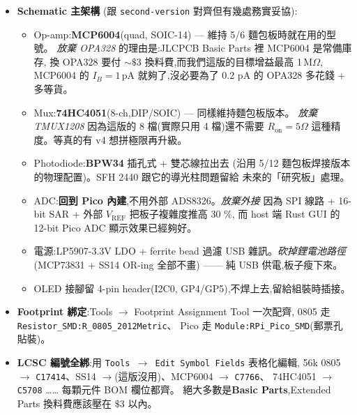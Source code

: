 \begin{itemize}[leftmargin=2em,itemsep=0pt]
  \item \textbf{Schematic 主架構} (跟 \texttt{second-version} 對齊但有幾處務實妥協):
        \begin{itemize}[leftmargin=2em,itemsep=0pt]
          \item Op-amp:\textbf{MCP6004}(quad, SOIC-14) — 維持 5/6 麵包板時就在用的型號。
                \emph{放棄 OPA328} 的理由是:JLCPCB Basic Parts 裡 MCP6004 是常備庫存,
                換 OPA328 要付 \(\sim \$3\) 換料費,而我們這版的目標增益最高 1\,M\(\Omega\),
                MCP6004 的 \(I_B = 1\,\mathrm{pA}\) 就夠了,沒必要為了 0.2 pA 的 OPA328
                多花錢 + 多等貨。
          \item Mux:\textbf{74HC4051}(8-ch,DIP/SOIC) — 同樣維持麵包板版本。
                \emph{放棄 TMUX1208} 因為這版的 8 檔(實際只用 4 檔)還不需要 \(R_\text{on} = 5\Omega\)
                這種精度。等真的有 v4 想拼極限再升級。
          \item Photodiode:\textbf{BPW34} 插孔式 + 雙芯線拉出去
                (沿用 5/12 麵包板焊接版本的物理配置)。SFH 2440 跟它的導光柱問題留給
                未來的「研究板」處理。
          \item ADC:\textbf{回到 Pico 內建},不用外部 ADS8326。\emph{放棄外接}
                因為 SPI 線路 + 16-bit SAR + 外部 \(V_\text{REF}\) 把板子複雜度推高 30 \%,
                而 host 端 Rust GUI 的 12-bit Pico ADC 顯示效果已經夠好。
          \item 電源:LP5907-3.3V LDO + ferrite bead 過濾 USB 雜訊。\emph{砍掉鋰電池路徑}
                (MCP73831 + SS14 OR-ing 全部不畫) —— 純 USB 供電,板子瘦下來。
          \item OLED 接腳留 4-pin header(I2C0, GP4/GP5),不焊上去,留給組裝時插接。
        \end{itemize}
  \item \textbf{Footprint 綁定}:Tools \(\to\) Footprint Assignment Tool 一次配齊,
        0805 走 \texttt{Resistor\_SMD:R\_0805\_2012Metric}、
        Pico 走 \texttt{Module:RPi\_Pico\_SMD}(郵票孔貼裝)。
  \item \textbf{LCSC 編號全綁}:用 \texttt{Tools \(\to\) Edit Symbol Fields} 表格化編輯,
        56k 0805 \(\to\) \texttt{C17414}、SS14 \(\to\)(這版沒用)、MCP6004 \(\to\) \texttt{C7766}、
        74HC4051 \(\to\) \texttt{C5708} …… 每顆元件 BOM 欄位都齊。
        絕大多數是\textbf{Basic Parts},Extended Parts 換料費應該壓在 \(\$3\) 以內。
\end{itemize}

